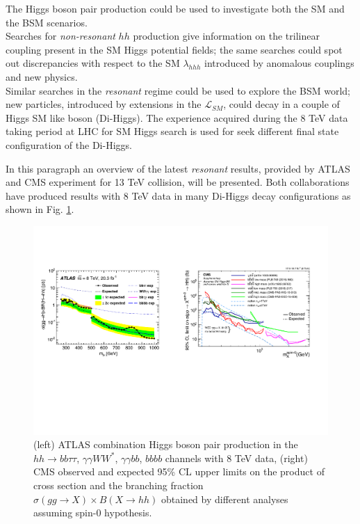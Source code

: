 \label{ref:HHProduction}

The Higgs boson pair production could be used to investigate both the SM and the BSM scenarios. 
\\
Searches for \emph{non-resonant} $hh$ production give information on the trilinear coupling present in the SM Higgs potential fields; the same searches could spot out discrepancies with respect to the SM $\lambda_{hhh}$ introduced by anomalous couplings and new physics.
\\
Similar searches in the \emph{resonant} regime could be used to explore the BSM world; new particles, introduced by extensions in the $\mathcal{L}_{SM}$, could decay in a couple of Higgs SM like boson (Di-Higgs). The experience acquired during the 8 TeV data taking period at LHC for SM Higgs search is used for seek different final state configuration of the Di-Higgs. 

In this paragraph an overview of the latest \emph{resonant} results, provided by ATLAS and CMS experiment for 13 TeV collision, will be presented. Both collaborations have produced results with 8 TeV data \cite{HH_ATLAS_8TeV}\cite{HH_CMS_8TeV} 
in many Di-Higgs decay configurations as shown in Fig. \ref{fig:HH_8TeV_Results}.
 
\begin{figure}[htb]
\centering
	\includegraphics[width=1.0\textwidth, angle=0] {figures/HH_8TeV.pdf}
\caption{(left) ATLAS combination Higgs boson pair production in the $hh\ensuremath{\rightarrow}bb\ensuremath{\tau}\ensuremath{\tau}$, $\ensuremath{\gamma}\ensuremath{\gamma}W{W}^{*}$, $\ensuremath{\gamma}\ensuremath{\gamma}bb$, $bbbb$ channels with 8 TeV data, (right) CMS observed and expected 95\% CL upper limits on the product of cross section and the branching fraction $\sigma(gg\rightarrow X) \times B(X\rightarrow hh)$ obtained by different analyses assuming spin-0 hypothesis.}
\label{fig:HH_8TeV_Results}   
\end{figure}

